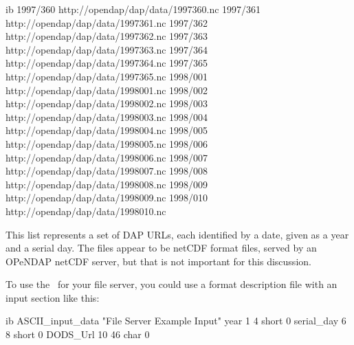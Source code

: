 \begin{vcode}{ib}
1997/360 http://opendap/dap/data/1997360.nc
1997/361 http://opendap/dap/data/1997361.nc
1997/362 http://opendap/dap/data/1997362.nc
1997/363 http://opendap/dap/data/1997363.nc
1997/364 http://opendap/dap/data/1997364.nc
1997/365 http://opendap/dap/data/1997365.nc
1998/001 http://opendap/dap/data/1998001.nc
1998/002 http://opendap/dap/data/1998002.nc
1998/003 http://opendap/dap/data/1998003.nc
1998/004 http://opendap/dap/data/1998004.nc
1998/005 http://opendap/dap/data/1998005.nc
1998/006 http://opendap/dap/data/1998006.nc
1998/007 http://opendap/dap/data/1998007.nc
1998/008 http://opendap/dap/data/1998008.nc
1998/009 http://opendap/dap/data/1998009.nc
1998/010 http://opendap/dap/data/1998010.nc
\end{vcode}

This list represents a set of DAP URLs, each identified by a date,
given as a year and a serial day.  The files appear to be netCDF
format files, served by an OPeNDAP netCDF server, but that is not
important for this discussion.

To use the \ffs\ for your file server, you could use a format
description file with an input section like this:

\begin{vcode}{ib}
ASCII_input_data "File Server Example Input"
year 1 4 short 0
serial_day 6 8 short 0
DODS_Url 10 46 char 0
\end{vcode}

